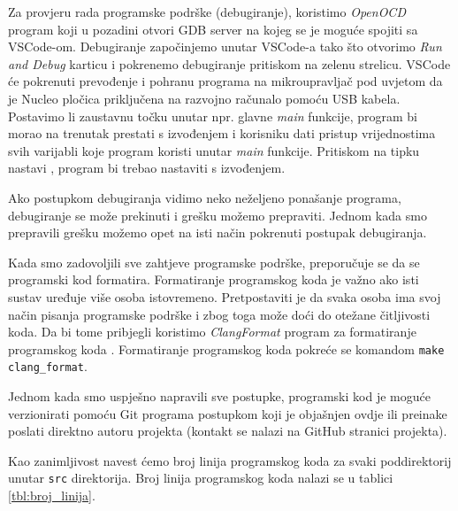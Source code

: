 \documentclass[times, utf8, diplomski, numeric]{templates/template}
\begin{document}
{{        Za provjeru rada programske podrške (debugiranje), koristimo \emph{OpenOCD} \cite{openocd} program koji u pozadini otvori GDB \cite{gdb} server na kojeg se je moguće spojiti sa VSCode-om. Debugiranje započinjemo unutar VSCode-a tako što otvorimo \emph{Run and Debug} karticu i pokrenemo debugiranje pritiskom na zelenu strelicu. VSCode će pokrenuti prevođenje i pohranu programa na mikroupravljač pod uvjetom da je Nucleo pločica priključena na razvojno računalo pomoću USB kabela. Postavimo li zaustavnu točku  unutar npr. glavne \emph{main} funkcije, program bi morao na trenutak prestati s izvođenjem i korisniku dati pristup vrijednostima svih varijabli koje program koristi unutar \emph{main} funkcije. Pritiskom na tipku nastavi , program bi trebao nastaviti s izvođenjem. 

        Ako postupkom debugiranja vidimo neko neželjeno ponašanje programa, debugiranje se može prekinuti i grešku možemo prepraviti. Jednom kada smo prepravili grešku možemo opet na isti način pokrenuti postupak debugiranja.

        Kada smo zadovoljili sve zahtjeve programske podrške, preporučuje se da se programski kod formatira. Formatiranje programskog koda je važno ako isti sustav uređuje više osoba istovremeno. Pretpostaviti je da svaka osoba ima svoj način pisanja programske podrške i zbog toga može doći do otežane čitljivosti koda. Da bi tome pribjegli koristimo \emph{ClangFormat} program za formatiranje programskog koda \cite{clang_format}. Formatiranje programskog koda pokreće se komandom \texttt{make clang\_format}.

        Jednom kada smo uspješno napravili sve postupke, programski kod je moguće verzionirati pomoću Git programa postupkom koji je objašnjen ovdje \cite{git_commit_instrukcije} ili preinake poslati direktno autoru projekta (kontakt se nalazi na GitHub stranici projekta).

        Kao zanimljivost navest ćemo broj linija programskog koda za svaki poddirektorij unutar \texttt{src} direktorija. Broj linija programskog koda nalazi se u tablici \ref{tbl:broj_linija}.

}}
\end{document}
